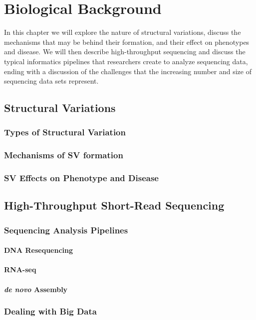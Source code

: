 \chapter{Biological Background}\label{chap_background}

In this chapter we will explore the nature of structural variations, discuss the mechanisms that may be behind their formation, and their effect on phenotypes and disease. We will then describe high-throughput sequencing and discuss the typical informatics pipelines that researchers create to analyze sequencing data, ending with a discussion of the challenges that the increasing number and size of sequencing data sets represent.

\section{Structural Variations}

\subsection{Types of Structural Variation}

\subsection{Mechanisms of SV formation}

\subsection{SV Effects on Phenotype and Disease}

\section{High-Throughput Short-Read Sequencing}

\subsection{Sequencing Analysis Pipelines}\label{section_pipelines}

\subsubsection{DNA Resequencing}

\subsubsection{RNA-seq}

\subsubsection{\emph{de novo} Assembly}

\subsection{Dealing with Big Data}
